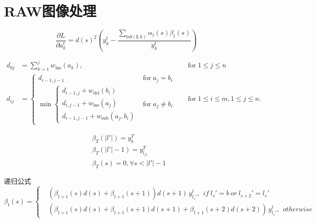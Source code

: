 \documentclass[winfonts]{njuthesis}
\begin{document}
\newpage %


\section{RAW图像处理}

\begin{equation}
\frac{\partial L}{\partial a_{k}^t} = {d(s)}^2 (y_{k}^t - \frac{\sum_{lab(\mathbf{l},k)} \alpha_t(s)\beta_t(s) }{y_{k}^t} )
\end{equation}

\begin{equation}
\begin{aligned}
d_{{0j}}&=\sum _{{k=1}}^{{j}}w_{{\mathrm  {ins}}}(a_{{k}}),\quad &{\text{for}}\;1\leq j\leq n\\
d_{{ij}}&={\begin{cases}d_{{i-1,j-1}}&{\text{for}}\;a_{{j}}=b_{{i}}\\\min {\begin{cases}d_{{i-1,j}}+w_{{\mathrm  {del}}}(b_{{i}})\\d_{{i,j-1}}+w_{{\mathrm  {ins}}}(a_{{j}})\\d_{{i-1,j-1}}+w_{{\mathrm  {sub}}}(a_{{j}},b_{{i}})\end{cases}}&{\text{for}}\;a_{{j}}\neq b_{{i}}\end{cases}}\quad &{\text{for}}\;1\leq i\leq m,1\leq j\leq n.
\end{aligned}
\end{equation}

\begin{equation}
\begin{aligned}
&\beta_T(|l{}'|)=y_{b}^{T}\\
&\beta_T(|l{}'|-1)=y_{l_|l|}^{T} \\
&\beta_T(s)=0, \forall s < |l{}'|-1
\end{aligned}
\end{equation}

递归公式
\begin{equation}
\beta_t(s)=\left\{
\begin{aligned}
& (\beta_{t+1}(s) d(s)+\beta_{t+1}(s+1))d(s+1)\,  y_{l_s{}'}^t, \: \: if \:  l_s{}'=b \:  or \:  l_{s+2}{}'=l_s{}'\\
& (\beta_{t+1}(s) d(s)+\beta_{t+1}(s+1)d(s+1)+\beta_{t+1}(s+2)d(s+2))\,  y_{l_s{}'}^t,\: \:   otherwise
\end{aligned}
\right.
\end{equation}
\end{document}
